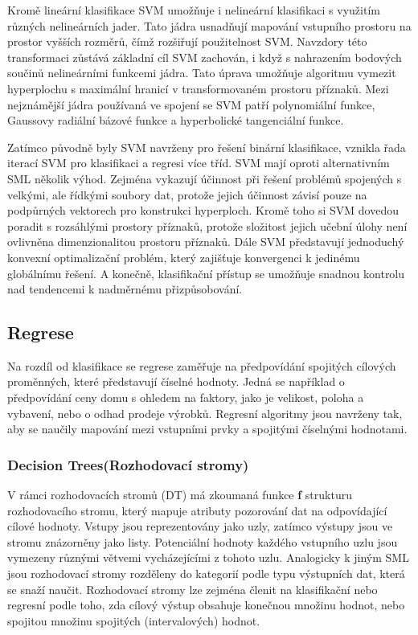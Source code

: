 Kromě lineární klasifikace SVM umožňuje i nelineární klasifikaci s využitím různých nelineárních jader. Tato jádra usnadňují mapování vstupního prostoru na prostor vyšších rozměrů, čímž rozšiřují použitelnost SVM. Navzdory této transformaci zůstává základní cíl SVM zachován, i když s nahrazením bodových součinů nelineárními funkcemi jádra. Tato úprava umožňuje algoritmu vymezit hyperplochu s maximální hranicí v transformovaném prostoru příznaků. Mezi nejznámější jádra používaná ve spojení se SVM patří polynomiální funkce, Gaussovy radiální bázové funkce a hyperbolické tangenciální funkce.

Zatímco původně byly SVM navrženy pro řešení binární klasifikace, vznikla řada iterací SVM pro klasifikaci a regresi více tříd. SVM mají oproti alternativním SML několik výhod. Zejména vykazují účinnost při řešení problémů spojených s velkými, ale řídkými soubory dat, protože jejich účinnost závisí pouze na podpůrných vektorech pro konstrukci hyperploch. Kromě toho si SVM dovedou poradit s rozsáhlými prostory příznaků, protože složitost jejich učební úlohy není ovlivněna dimenzionalitou prostoru příznaků. Dále SVM představují jednoduchý konvexní optimalizační problém, který zajišťuje konvergenci k jedinému globálnímu řešení. A konečně, klasifikační přístup se  umožňuje snadnou kontrolu nad tendencemi k nadměrnému přizpůsobování.

\newpage

\subsection{Regrese}
Na rozdíl od klasifikace se regrese zaměřuje na předpovídání spojitých cílových proměnných, které představují číselné hodnoty. Jedná se například o předpovídání ceny domu s ohledem na faktory, jako je velikost, poloha a vybavení, nebo o odhad prodeje výrobků. Regresní algoritmy jsou navrženy tak, aby se naučily mapování mezi vstupními prvky a spojitými číselnými hodnotami.

\subsubsection{Decision Trees(Rozhodovací stromy)}
V rámci rozhodovacích stromů (DT)\cite{Breiman2017} má zkoumaná funkce \textbf{f} strukturu rozhodovacího stromu, který mapuje atributy pozorování dat na odpovídající cílové hodnoty. Vstupy jsou reprezentovány jako uzly, zatímco výstupy jsou ve stromu znázorněny jako listy. Potenciální hodnoty každého vstupního uzlu jsou vymezeny různými větvemi vycházejícími z tohoto uzlu. Analogicky k jiným SML jsou rozhodovací stromy rozděleny do kategorií podle typu výstupních dat, která se snaží naučit. Rozhodovací stromy lze zejména členit na klasifikační nebo regresní podle toho, zda cílový výstup obsahuje konečnou množinu hodnot, nebo spojitou množinu spojitých (intervalových) hodnot.

